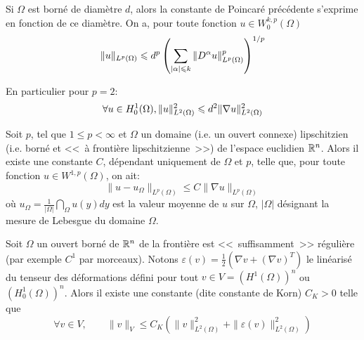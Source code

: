 \medskip

\begin{theoreme}
Si $\Omega$ est borné de diamètre $d$, alors la constante de Poincaré
précédente s'exprime en fonction de ce diamètre. On a,
pour toute fonction $u\in W_0^{k,p}(\Omega)$
\begin{equation}
\|u\|_{L^p(\Omega)} \leqslant d^p \left( \displaystyle\sum_{|\alpha|\leqslant k} \|D^\alpha u\|^p_{L^p(\Omega)}\right)^{1/p}
\end{equation}
\end{theoreme}

En particulier pour $p=2$:
\begin{equation} \colorred\forall u\in H^1_0(\Omega), \|u\|^2_{L^2(\Omega)} \le d^2
\|\nabla u\|^2_{L^2(\Omega)} \end{equation}


\medskip

\begin{theoreme}
Soit $p$, tel que $1 \le p <\infty$ et $\Omega$ un domaine (i.e. un ouvert  connexe) lipschitzien
(i.e. borné et <<~à frontière lipschitzienne~>>) de l'espace euclidien
$\mathbb R^n$.
Alors il existe une constante $C$, dépendant uniquement de $\Omega$ et $p$, telle que,
pour toute fonction $u\in W^{1,p}(\Omega)$, on ait:
\begin{equation}
\|u-u_\Omega\|_{L^p(\Omega)} \le C \|\nabla u\|_{L^p(\Omega)}
\end{equation}
où $u_\Omega=\frac1{|\Omega|}\dint_\Omega u(y)dy$ est la valeur
moyenne de $u$ sur $\Omega$, $|\Omega|$ désignant la mesure de Lebesgue
du domaine $\Omega$.
\end{theoreme}


\bigskip
\begin{theoreme}
Soit $\Omega$ un ouvert borné de $\mathbb R^n$ de la frontière est <<~suffisamment~>> régulière
(par exemple $C^1$ par morceaux).
Notons $\varepsilon(v)=\frac{1}{2}\left(\nabla v + (\nabla v)^T \right)$ le linéarisé du
tenseur des déformations défini pour tout $v\in V=\left(H^1(\Omega)\right)^n$ ou
$\left(H^1_0(\Omega)\right)^n$.
Alors il existe une constante (dite constante de Korn) $C_K>0$ telle que
\begin{equation}
\forall v\in V, \qquad
 \|v\|_{V} \le C_K \left(  \|v\|^2_{L^2(\Omega)}+ \|\varepsilon(v)\|^2_{L^2(\Omega)}
\right)
\end{equation}
\end{theoreme}

